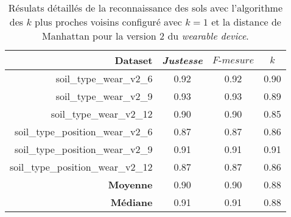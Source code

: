 \begin{table}[H]\renewcommand{\arraystretch}{0.5}
	\centering
	\caption{Résulats détaillés de la reconnaissance des sols avec l'algorithme des $k$ plus proches voisins configuré avec $k=1$ et la distance de Manhattan pour la version 2 du \textit{wearable device}.}
	\label{tab:tab:knn-dM-wear-v2}
	\begin{tabular}{@{}rccc@{}}
		\toprule
			\textbf{Dataset} & \textit{Justesse} & $F\mbox{-} mesure$ & \textbf{$k$} \\
		\midrule
			soil\_type\_wear\_v2\_6 & 0.92 & 0.92 & 0.90 \\
			soil\_type\_wear\_v2\_9 & 0.93 & 0.93 & 0.89 \\
			soil\_type\_wear\_v2\_12 & 0.90 & 0.90 & 0.85 \\
			soil\_type\_position\_wear\_v2\_6 & 0.87 & 0.87 & 0.86 \\
			soil\_type\_position\_wear\_v2\_9 & 0.91 & 0.91 & 0.91 \\
			soil\_type\_position\_wear\_v2\_12 & 0.87 & 0.87 & 0.86 \\
			\textbf{Moyenne} & 0.90 & 0.90 & 0.88 \\
			\textbf{Médiane} & 0.91 & 0.91 & 0.88 \\
		\bottomrule
	\end{tabular}
\end{table}

